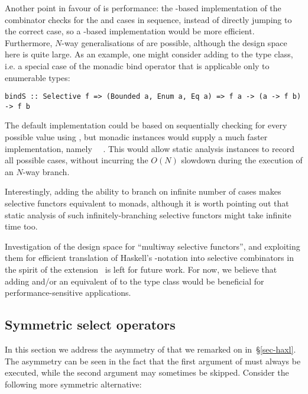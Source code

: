Another point in favour of  is performance: the -based
implementation of the  combinator checks for the  and
 cases in sequence, instead of directly jumping to the correct case,
so a -based implementation would be more efficient. Furthermore,
$N$-way generalisations of  are possible, although the design space
here is quite large. As an example, one might consider adding  to the
 type class, i.e. a special case of the monadic bind operator that
is applicable only to enumerable types:

\vspace{1mm}
\begin{verbatim}
bindS :: Selective f => (Bounded a, Enum a, Eq a) => f a -> (a -> f b) -> f b
\end{verbatim}
\vspace{1mm}

\noindent
The default implementation could be based on sequentially checking for every
possible value using , but monadic instances would supply a much
faster implementation, namely ~\hs{=}~\hs{(>>=)}. This would allow
static analysis instances to record all possible cases, without incurring
the $O(N)$ slowdown during the execution of an $N$-way branch.

Interestingly, adding the ability to branch on infinite number of cases makes
selective functors equivalent to monads, although it is worth pointing out that
static analysis of such infinitely-branching selective functors might take
infinite time too.

Investigation of the design space for ``multiway selective functors'', and
exploiting them for efficient translation of Haskell's -notation into
selective combinators in the spirit of the 
extension~\citep{marlow2016applicativedo} is left for future work. For now, we
believe that adding  and/or an equivalent of  to the
 type class would be beneficial for performance-sensitive
applications.

\subsection{Symmetric select operators}\label{sec-alt-symmetric}

In this section we address the asymmetry of  that we remarked on
in~\S\ref{sec-haxl}. The asymmetry can be seen in the fact that the first
argument of  must always be executed, while the second argument may
sometimes be skipped. Consider the following more symmetric alternative:

